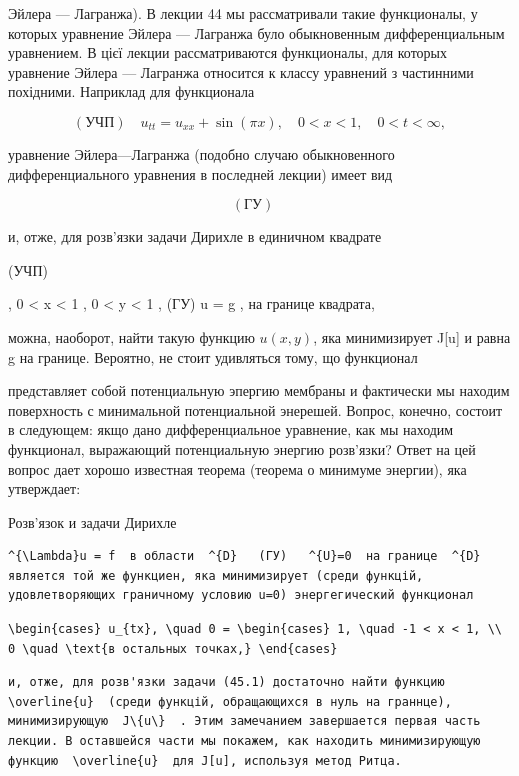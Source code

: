 \documentclass[
  ukrainian,
]{article}
\begin{document}
Эйлера --- Лагранжа). В лекции 44 мы рассматривали такие функционалы, у
которых уравнение Эйлера --- Лагранжа було обыкновенным дифференциальным
уравнением. В цієї лекции рассматриваются функционалы, для которых
уравнение Эйлера --- Лагранжа относится к классу уравнений з частинними
похідними. Наприклад для функционала

\[
(\text{УЧП}) \quad u_{tt} = u_{xx} + \sin(\pi x), \quad 0 < x < 1, \quad 0 < t < \infty,
\]

уравнение Эйлера---Лагранжа (подобно случаю обыкновенного
дифференциального уравнения в последней лекции) имеет вид

\[
(\text{ГУ}) \quad
\]

и, отже, для розв'язки задачи Дирихле в единичном квадрате

(УЧП)

, 0 \textless{} x \textless{} 1 , 0 \textless{} y \textless{} 1 , (ГУ) u
= g , на границе квадрата,

можна, наоборот, найти такую функцию \(u(x, y)\), яка минимизирует
J{[}u{]} и равна g на границе. Вероятно, не стоит удивляться тому, що
функционал

представляет собой потенциальную эпергию мембраны и фактически мы
находим поверхность с минимальной потенциальной энерешей. Вопрос,
конечно, состоит в следующем: якщо дано дифференциальное уравнение, как
мы находим функционал, выражающий потенциальную энергию розв'язки? Ответ
на цей вопрос дает хорошо известная теорема (теорема о минимуме
энергии), яка утверждает:

Розв'язок и задачи Дирихле

\begin{verbatim}
^{\Lambda}u = f  в области  ^{D}   (ГУ)   ^{U}=0  на границе  ^{D}  является той же функциен, яка минимизирует (среди функцій, удовлетворяющих граничному условию u=0) энергегический функционал
\end{verbatim}

\begin{verbatim}
\begin{cases} u_{tx}, \quad 0 = \begin{cases} 1, \quad -1 < x < 1, \\ 0 \quad \text{в остальных точках,} \end{cases}
\end{verbatim}

\begin{verbatim}
и, отже, для розв'язки задачи (45.1) достаточно найти функцию  \overline{u}  (среди функцій, обращающихся в нуль на граннце), минимизирующую  J\{u\}  . Этим замечанием завершается первая часть лекции. В оставшейся части мы покажем, как находить минимизирующую функцию  \overline{u}  для J[u], используя метод Ритца.
\end{verbatim}
\end{document}
